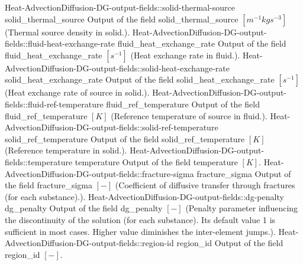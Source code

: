 \begin{SelectionType}
		\SelectionItem
			{Heat-AdvectionDiffusion-DG-output-fields::solid-thermal-source}
			{solid{\_}thermal{\_}source}
			{{{Output of the field solid{\_}thermal{\_}source }{$[m^{-1}kgs^{-3}]$}{ (Thermal source density in solid.).}}}
		\SelectionItem
			{Heat-AdvectionDiffusion-DG-output-fields::fluid-heat-exchange-rate}
			{fluid{\_}heat{\_}exchange{\_}rate}
			{{{Output of the field fluid{\_}heat{\_}exchange{\_}rate }{$[s^{-1}]$}{ (Heat exchange rate in fluid.).}}}
		\SelectionItem
			{Heat-AdvectionDiffusion-DG-output-fields::solid-heat-exchange-rate}
			{solid{\_}heat{\_}exchange{\_}rate}
			{{{Output of the field solid{\_}heat{\_}exchange{\_}rate }{$[s^{-1}]$}{ (Heat exchange rate of source in solid.).}}}
		\SelectionItem
			{Heat-AdvectionDiffusion-DG-output-fields::fluid-ref-temperature}
			{fluid{\_}ref{\_}temperature}
			{{{Output of the field fluid{\_}ref{\_}temperature }{$[K]$}{ (Reference temperature of source in fluid.).}}}
		\SelectionItem
			{Heat-AdvectionDiffusion-DG-output-fields::solid-ref-temperature}
			{solid{\_}ref{\_}temperature}
			{{{Output of the field solid{\_}ref{\_}temperature }{$[K]$}{ (Reference temperature in solid.).}}}
		\SelectionItem
			{Heat-AdvectionDiffusion-DG-output-fields::temperature}
			{temperature}
			{{{Output of the field temperature }{$[K]$}{.}}}
		\SelectionItem
			{Heat-AdvectionDiffusion-DG-output-fields::fracture-sigma}
			{fracture{\_}sigma}
			{{{Output of the field fracture{\_}sigma }{$[-]$}{ (Coefficient of diffusive transfer through fractures (for each substance).).}}}
		\SelectionItem
			{Heat-AdvectionDiffusion-DG-output-fields::dg-penalty}
			{dg{\_}penalty}
			{{{Output of the field dg{\_}penalty }{$[-]$}{ (Penalty parameter influencing the discontinuity of the solution (for each substance). Its default value 1 is sufficient in most cases. Higher value diminishes the inter-element jumps.).}}}
		\SelectionItem
			{Heat-AdvectionDiffusion-DG-output-fields::region-id}
			{region{\_}id}
			{{{Output of the field region{\_}id }{$[-]$}{.}}}
\end{SelectionType}
